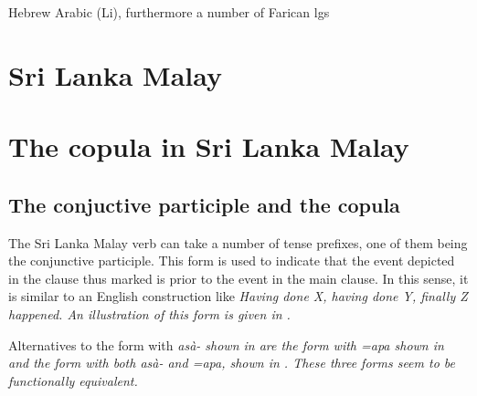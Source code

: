 \documentclass[a4paper,12pt]{article}
\begin{document}
Hebrew Arabic (Li), furthermore a number of Farican lgs \citep[56]{Pustet}

\section{Sri Lanka Malay}
\section{The copula in Sri Lanka Malay}
\subsection{The conjuctive participle and the copula}
The Sri Lanka Malay verb can take a number of tense prefixes, one of them being the conjunctive participle. This form is used to indicate that the event depicted in the clause thus marked is prior to the event in the main clause. In this sense, it is similar to an English construction like \em Having done X, having done Y, finally Z happened\em. An illustration of this form is given in .




Alternatives to the form with \em asà- \em shown in  are the form with \em =apa \em shown in  and the form with both \em asà- \em and \em =apa\em, shown in . These three forms seem to be functionally equivalent.

\end{document}
